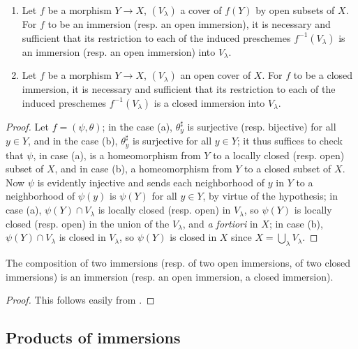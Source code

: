 \begin{cor}[4.2.4]
\label{1.4.2.4}
\medskip\noindent
\begin{enumerate}[label={\rm(\alph*)}]
  \item Let $f$ be a morphism $Y\to X$, $(V_\lambda)$ a cover of $f(Y)$ by open subsets of $X$.
    For $f$ to be an immersion (resp. an open immersion), it is necessary and sufficient
    that its restriction to each of the induced preschemes $f^{-1}(V_\lambda)$ is an immersion (resp. an open immersion) into $V_\lambda$.
  \item Let $f$ be a morphism $Y\to X$, $(V_\lambda)$ an open cover of $X$.
    For $f$ to be a closed immersion, it is necessary and sufficient that its restriction to each of the induced preschemes $f^{-1}(V_\lambda)$ is a closed immersion into $V_\lambda$.
\end{enumerate}
\end{cor}

\begin{proof}
\label{proof-1.4.2.4}
Let $f=(\psi,\theta)$; in the case (a), $\theta_y^\sharp$ is surjective (resp. bijective) for all $y\in Y$, and in the case (b), $\theta_y^\sharp$ is surjective for all $y\in Y$; it thus suffices to check that $\psi$, in case (a), is a homeomorphism from $Y$ to a locally closed (resp. open) subset of $X$, and in case (b), a homeomorphism from $Y$ to a closed subset of $X$.
Now $\psi$ is evidently injective and sends each neighborhood of $y$ in $Y$ to a neighborhood of $\psi(y)$ is $\psi(Y)$ for all $y\in Y$, by virtue of the hypothesis; in case (a), $\psi(Y)\cap V_\lambda$ is locally closed (resp. open) in $V_\lambda$, so $\psi(Y)$ is locally closed (resp. open) in the union of the $V_\lambda$, and \emph{a fortiori} in $X$; in case (b), $\psi(Y)\cap V_\lambda$ is closed in $V_\lambda$, so $\psi(Y)$ is closed in $X$ since $X=\bigcup_\lambda V_\lambda$.
\end{proof}

\begin{prop}[4.2.5]
\label{1.4.2.5}
The composition of two immersions (resp. of two open immersions, of two closed immersions) is an immersion (resp. an open immersion, a closed immersion).
\end{prop}

\begin{proof}
\label{proof-1.4.2.5}
This follows easily from .
\end{proof}

\subsection{Products of immersions}
\label{subsection-products-of-immersions}

